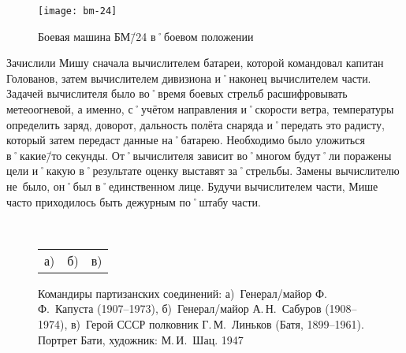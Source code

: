 \begin{wrapfigure}{O}{.4\textwidth}
\centering
\texttt{[image: bm-24]}
\caption[Боевая машина БМ\=/24 в˚боевом положении]{Боевая машина БМ\=/24 в˚боевом положении\footnotemark}
\label{fig:bm-24}
\end{wrapfigure}

Зачислили Мишу сначала вычислителем батареи, которой командовал капитан Голованов, затем вычислителем дивизиона и˚наконец вычислителем части. Задачей вычислителя было во˚время боевых стрельб расшифровывать метеоогневой, а именно, с˚учётом направления и˚скорости ветра, температуры определить заряд, доворот, дальность полёта снаряда и˚передать это радисту, который затем передаст данные на˚батарею. Необходимо было уложиться в˚какие\=/то секунды. От˚вычислителя зависит во˚многом будут˚ли поражены цели и˚какую в˚результате оценку выставят за˚стрельбы. Замены вычислителю не~было, он˚был в˚единственном лице. Будучи вычислителем части, Мише часто приходилось быть дежурным по˚штабу части. 

\begin{figure}[h]
	\hfil	
	\begin{minipage}[b]{0.32\linewidth}			
	\end{minipage}	
	\hfil	
	\begin{minipage}[b]{0.32\linewidth}	
	\end{minipage}	
	\hfil	
	\begin{minipage}[b]{0.32\linewidth}		
	\end{minipage}	
	\hfil
	\\[1ex]	
	\begin{minipage}[b]{.96\linewidth}
		\begin{tabular}{p{.32\linewidth}p{.32\linewidth}p{.32\linewidth}}
			\centering а) & \centering б) & \centering в) 
		\end{tabular}
	\end{minipage}	
	\captionsetup{skip=1ex}							%
	\caption{Командиры партизанских соединений: 
	а)~Генерал\-/майор Ф.\,Ф.~Капуста (1907–1973), 
	б)~Генерал\-/майор А.\,Н.~Сабуров (1908–1974), 
	в)~Герой СССР полковник Г.\,М.~Линьков (Батя, 1899–1961). Портрет Бати, художник: М.\,И.~Шац. 1947}
\end{figure}

